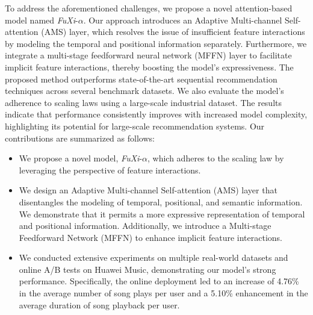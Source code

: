 To address the aforementioned challenges, we propose a novel attention-based model named \textit{FuXi}-$\alpha$. Our approach introduces an Adaptive Multi-channel Self-attention (AMS) layer, which resolves the issue of insufficient feature interactions by modeling the temporal and positional information separately. Furthermore, we integrate a multi-stage feedforward neural network (MFFN) layer to facilitate implicit feature interactions, thereby boosting the model's expressiveness. The proposed method outperforms state-of-the-art sequential recommendation techniques across several benchmark datasets. We also evaluate the model's adherence to scaling laws using a large-scale industrial dataset. The results indicate that performance consistently improves with increased model complexity, highlighting its potential for large-scale recommendation systems. Our contributions are summarized as follows:
\begin{itemize}[leftmargin=*,align=left]
    \item We propose a novel model, \textit{FuXi}-$\alpha$, which adheres to the scaling law by leveraging the perspective of feature interactions.
    \item We design an Adaptive Multi-channel Self-attention (AMS) layer that disentangles the modeling of temporal, positional, and semantic information. We demonstrate that it permits a more expressive representation of temporal and positional information. Additionally, we introduce a Multi-stage Feedforward Network (MFFN) to enhance implicit feature interactions.
    \item We conducted extensive experiments on multiple real-world datasets and online A/B tests on Huawei Music, demonstrating our model's strong performance. Specifically, the online deployment led to an increase of 4.76\% in the average number of song plays per user and a 5.10\% enhancement in the average duration of song playback per user. 
\end{itemize}